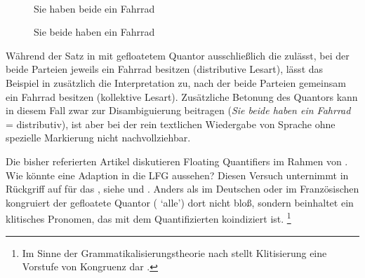 \begin{figure}
\\
\caption{Sie haben beide ein Fahrrad}
\label{fig:siebeidefhrd_1}
\end{figure}

\begin{figure}
\caption{Sie beide haben ein Fahrrad}
\label{fig:siebeidefhrd_2}
\end{figure}

Während der Satz in  mit gefloatetem Quantor
ausschließlich die  zulässt, bei der beide Parteien jeweils ein
Fahrrad besitzen (distributive Lesart), lässt das Beispiel in
 zusätzlich die Interpretation zu, nach der beide
Parteien gemeinsam ein Fahrrad besitzen (kollektive Lesart). Zusätzliche
Betonung des Quantors kann in diesem Fall zwar zur Disambiguierung beitragen
(\emph{Sie \emph{beide} haben ein Fahrrad} = distributiv), ist aber bei der
rein textlichen Wiedergabe von Sprache ohne spezielle Markierung nicht
nachvollziehbar.

\label{phsec:hebrqf}
Die bisher referierten Artikel diskutieren Floating Quantifiers im Rahmen von
 \autocite{chomsky1981}. Wie könnte eine Adaption in
die LFG aussehen?
Diesen Versuch unternimmt \citet{spector2009} in Rückgriff auf
\citet{shlonsky1991} für das , siehe  und
. Anders als im Deutschen oder im
Französischen kongruiert der gefloatete Quantor (
`alle') dort nicht bloß, sondern beinhaltet ein klitisches Pronomen, das mit
dem Quantifizierten koindiziert ist.%
%
	\footnote{Im Sinne der
		Grammatikalisierungs\-theorie nach
		\citet{lehmann2015} stellt Klitisierung eine Vorstufe von Kongruenz dar
		\autocite[vgl.][44]{lehmann2015}.%
	}

